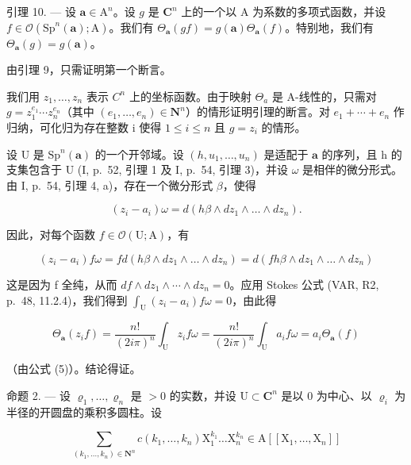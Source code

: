 引理 10. --- 设 \(\boldsymbol{a} \in \mathrm{A}^n\)。设 \(g\) 是 \(\mathbf{C}^n\) 上的一个以 A 为系数的多项式函数，并设 \(f \in \mathcal{O}(\mathrm{Sp}^n(\boldsymbol{a});\mathrm{A})\)。我们有 \(\Theta_{\boldsymbol{a}}(gf) = g(\boldsymbol{a})\Theta_{\boldsymbol{a}}(f)\)。特别地，我们有 \(\Theta_{\boldsymbol{a}}(g) = g(\boldsymbol{a})\)。

由引理 9，只需证明第一个断言。

我们用 \(z_{1},\ldots,z_{n}\) 表示 \(C^{n}\) 上的坐标函数。由于映射 \(\Theta_{a}\) 是 A-线性的，只需对 \(g=z_{1}^{e_{1}}\cdots z_{n}^{e_{n}}\)（其中 \((e_{1},\ldots,e_{n})\in\mathbf{N}^{n}\)）的情形证明引理的断言。对 \(e_{1}+\cdots+e_{n}\) 作归纳，可化归为存在整数 i 使得 \(1\leqslant i\leqslant n\) 且 \(g=z_{i}\) 的情形。

设 U 是 \(\mathrm{Sp}^{n}(\boldsymbol{a})\) 的一个开邻域。设 \((h,u_{1},\ldots,u_{n})\) 是适配于 \(\boldsymbol{a}\) 的序列，且 h 的支集包含于 U (I, p.~52, 引理 1 及 I, p.~54, 引理 3)，并设 \(\omega\) 是相伴的微分形式。由 I, p.~54, 引理 4, a)，存在一个微分形式 \(\beta\)，使得

\[
(z _ {i} - a _ {i}) \omega = d (h \beta \wedge d z _ {1} \wedge \dots \wedge d z _ {n}).
\]

因此，对每个函数 \(f \in \mathcal{O}(\mathrm{U};\mathrm{A})\)，有

\[
\left(z _ {i} - a _ {i}\right) f \omega = f d \left(h \beta \wedge d z _ {1} \wedge \dots \wedge d z _ {n}\right) = d \left(f h \beta \wedge d z _ {1} \wedge \dots \wedge d z _ {n}\right)
\]

这是因为 f 全纯，从而 \(df \wedge dz_{1} \wedge \cdots \wedge dz_{n} = 0\)。应用 Stokes 公式 (VAR, R2, p.~48, 11.2.4)，我们得到 \(\int_{\mathrm{U}}(z_{i} - a_{i})f\omega = 0\)，由此得

\[
\Theta_ {\boldsymbol {a}} (z _ {i} f) = \frac {n !}{(2 i \pi) ^ {n}} \int_ {\mathrm{U}} z _ {i} f \omega = \frac {n !}{(2 i \pi) ^ {n}} \int_ {\mathrm{U}} a _ {i} f \omega = a _ {i} \Theta_ {\boldsymbol {a}} (f)
\]

（由公式 (5)）。结论得证。

命题 2. — 设 \(\varrho_{1},\ldots,\varrho_{n}\) 是 \(>0\) 的实数，并设 \(\mathrm{U}\subset\mathbf{C}^{n}\) 是以 0 为中心、以 \(\varrho_{i}\) 为半径的开圆盘的乘积多圆柱。设

\[
\sum_ {(k _ {1}, \dots , k _ {n}) \in \mathbf {N} ^ {n}} c (k _ {1}, \dots , k _ {n}) \mathrm{X} _ {1} ^ {k _ {1}} \dots \mathrm{X} _ {n} ^ {k _ {n}} \in \mathrm{A} [ [ \mathrm{X} _ {1}, \dots , \mathrm{X} _ {n} ] ]
\]


